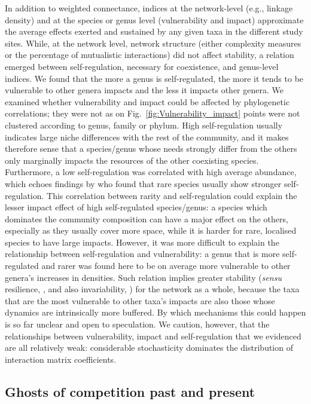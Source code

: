 \documentclass[10pt]{article}
\begin{document}
In addition to weighted connectance, indices at the network-level
(e.g., linkage density) and at the species or genus level (vulnerability
and impact) approximate the average effects exerted and sustained
by any given taxa in the different study sites. While, at the network
level, network structure (either complexity measures or the percentage
of mutualistic interactions) did not affect stability, a relation
emerged between self-regulation, necessary for coexistence, and genus-level
indices. We found that the more a genus is self-regulated, the more
it tends to be vulnerable to other genera impacts and the less it
impacts other genera. We examined whether vulnerability
and impact could be affected by phylogenetic correlations; they were
not as on Fig.~\ref{fig:Vulnerability_impact} points were not clustered
according to genus, family or phylum. High self-regulation usually indicates large
niche differences with the rest of the community, and it makes therefore
sense that a species/genus whose needs strongly differ from the others
only marginally impacts the resources of the other coexisting species.
Furthermore, a low self-regulation was correlated with high average
abundance, which echoes findings by \citet{yenni_persistent_2017}
who found that rare species usually show stronger self-regulation.
This correlation between rarity and self-regulation could explain
the lesser impact effect of high self-regulated species/genus: a species
which dominates the community composition can have a major effect
on the others, especially as they usually cover more space, while
it is harder for rare, localised species to have large impacts. However,
it was more difficult to explain the relationship between self-regulation
and vulnerability: a genus that is more self-regulated and rarer was
found here to be on average more vulnerable to other genera's increases
in densities. Such relation implies greater stability (\emph{sensu}
resilience, \citealt{ives_estimating_2003}, and also invariability, \citealt{Arnoldi431296}) for the network as a whole, because the taxa that are
the most vulnerable to other taxa's impacts are also those whose dynamics
are intrinsically more buffered. By which mechanisms this could happen
is so far unclear and open to speculation. We caution, however, that
the relationships between vulnerability, impact and self-regulation
that we evidenced are all relatively weak: considerable stochasticity
dominates the distribution of interaction matrix coefficients.

\subsection*{Ghosts of competition past and present}
\end{document}
